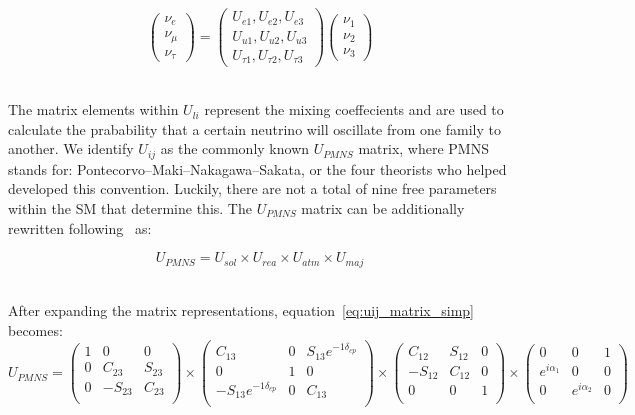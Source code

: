 \begin{equation}
\begin{pmatrix}
\nu_e\\
\nu_{\mu}\\
\nu_{\tau}
\end{pmatrix}
=
\begin{pmatrix}
U_{e1}, U_{e2}, U_{e3} \\
U_{u1}, U_{u2}, U_{u3} \\
U_{\tau1}, U_{\tau2}, U_{\tau3}
\end{pmatrix}
\begin{pmatrix}
\nu_1\\
\nu_2\\
\nu_3
\end{pmatrix}
\end{equation}
~\label{eq:mass_eigenstates}

The matrix elements within $U_{li}$ represent the mixing coeffecients and are used to calculate the prabability that a certain neutrino will oscillate from one family to another.
We identify $U_{ij}$ as the commonly known $U_{PMNS}$ matrix, where PMNS stands for: Pontecorvo–Maki–Nakagawa–Sakata, or the four theorists who helped developed this convention.
Luckily, there are not a total of nine free parameters within the SM that determine this.
The $U_{PMNS}$ matrix can be additionally rewritten following~\citep{Pontecorvo:1957qd, 1962PThPh..28..870M} as:

\begin{equation}
U_{PMNS}
=
U_{sol} \times U_{rea} \times U_{atm} \times U_{maj}
\end{equation}
~\label{eq:uij_matrix_simp}

After expanding the matrix representations, equation~\ref{eq:uij_matrix_simp} becomes:
\begin{equation}
U_{PMNS}
=
\begin{pmatrix}
1 & 0 & 0 \\
0 & C_{23} & S_{23} \\
0 & -S_{23} & C_{23} \\
\end{pmatrix}
\times
\begin{pmatrix}
C_{13} & 0 & S_{13}e^{-1\delta_{cp}} \\
0 & 1 & 0 \\
-S_{13}e^{-1\delta_{cp}} & 0 & C_{13} \\
\end{pmatrix}
\times
\begin{pmatrix}
C_{12} & S_{12} & 0 \\
-S_{12} & C_{12} & 0 \\
0 & 0 & 1 \\
\end{pmatrix}
\times
\begin{pmatrix}
0 & 0 & 1 \\
e^{i\alpha_{1}} & 0 & 0 \\
0 & e^{i\alpha_{2}} & 0 \\
\end{pmatrix}
\end{equation}

